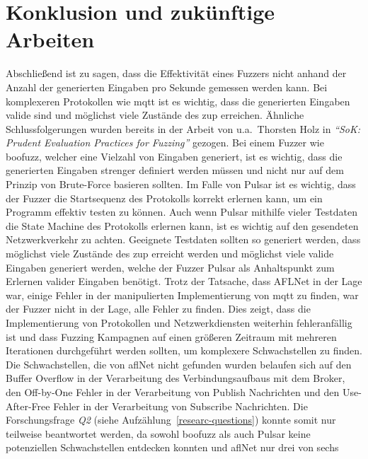 
\section{Konklusion und zukünftige Arbeiten}\label{sec:conclusion}
Abschließend ist zu sagen, dass die Effektivität eines Fuzzers nicht anhand der Anzahl der generierten Eingaben pro Sekunde
gemessen werden kann.
Bei komplexeren Protokollen wie \gls{mqtt} ist es wichtig, dass die generierten Eingaben valide sind und möglichst viele
Zustände des \gls{zup} erreichen.
Ähnliche Schlussfolgerungen wurden bereits in der Arbeit von u.a.\ Thorsten Holz in \textit{\enquote{SoK: Prudent Evaluation Practices for Fuzzing}}
\cite{fuzzing-evaluation} gezogen.
Bei einem Fuzzer wie boofuzz, welcher eine Vielzahl von Eingaben generiert, ist es wichtig, dass die generierten Eingaben
strenger definiert werden müssen und nicht nur auf dem Prinzip von Brute-Force basieren sollten.
Im Falle von Pulsar ist es wichtig, dass der Fuzzer die Startsequenz des Protokolls korrekt erlernen kann, um ein Programm
effektiv testen zu können.
Auch wenn Pulsar mithilfe vieler Testdaten die State Machine des Protokolls erlernen kann, ist es wichtig auf den gesendeten
Netzwerkverkehr zu achten.
Geeignete Testdaten sollten so generiert werden, dass möglichst viele Zustände des \gls{zup} erreicht werden und möglichst
viele valide Eingaben generiert werden, welche der Fuzzer Pulsar als Anhaltspunkt zum Erlernen valider Eingaben benötigt.\newline\newline
Trotz der Tatsache, dass AFLNet in der Lage war, einige Fehler in der manipulierten Implementierung von \gls{mqtt} zu finden, war der Fuzzer
nicht in der Lage, alle Fehler zu finden.
Dies zeigt, dass die Implementierung von Protokollen und Netzwerkdiensten weiterhin fehleranfällig ist und dass
Fuzzing Kampagnen auf einen größeren Zeitraum mit mehreren Iterationen durchgeführt werden sollten, um komplexere Schwachstellen
zu finden.
Die Schwachstellen, die von \gls{afl}Net nicht gefunden wurden belaufen sich auf den Buffer Overflow in der Verarbeitung
des Verbindungsaufbaus mit dem Broker, den Off-by-One Fehler in der Verarbeitung von Publish Nachrichten und den Use-After-Free
Fehler in der Verarbeitung von Subscribe Nachrichten.
Die Forschungsfrage \textit{Q2} (siehe Aufzählung~\ref{researc-questions}) konnte somit nur teilweise beantwortet werden,
da sowohl boofuzz als auch Pulsar keine potenziellen Schwachstellen entdecken konnten und \gls{afl}Net nur drei von sechs
